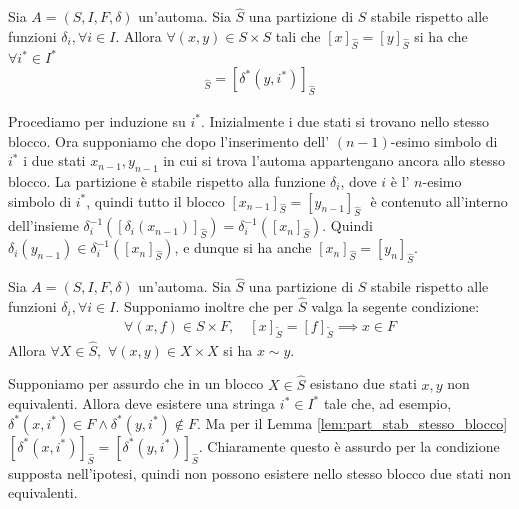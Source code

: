 \begin{lemma}
    \label{lem:part_stab_stesso_blocco}
    Sia $A = (S,I,F,\delta)$ un'automa. Sia $\widehat{S}$ una partizione di $S$ stabile rispetto alle funzioni $\delta_i, \forall i \in I$. Allora $\forall (x,y) \in S \times S$ tali che $[x]_{\widehat{S}} = [y]_{\widehat{S}}$ si ha che $\forall i^* \in I^*$
    \begin{gather*}
        [\delta^*(x,i^*)]_{\widehat{S}} = [\delta^*(y,i^*)]_{\widehat{S}}
    \end{gather*}
\end{lemma}
\begin{proof2}
    Procediamo per induzione su $i^*$. Inizialmente i due stati si trovano nello stesso blocco. Ora supponiamo che dopo l'inserimento dell' $(n-1)$-esimo simbolo di $i^*$ i due stati $x_{n-1}, y_{n-1}$ in cui si trova l'automa appartengano ancora allo stesso blocco. La partizione è stabile rispetto alla funzione $\delta_i$, dove $i$ è l' $n$-esimo simbolo di $i^*$, quindi tutto il blocco $[x_{n-1}]_{\widehat{S}} = [y_{n-1}]_{\widehat{S}}\,\,$ è contenuto all'interno dell'insieme $\delta_i^{-1}([\delta_i(x_{n-1})]_{\widehat{S}}) = \delta_i^{-1}([x_n]_{\widehat{S}})$. Quindi $\delta_i(y_{n-1}) \in \delta_i^{-1}([x_n]_{\widehat{S}})$, e dunque si ha anche $[x_n]_{\widehat{S}} = [y_n]_{\widehat{S}}$.
\end{proof2}
\begin{lemma}
    \label{lem:part_stab_equiv}
    Sia $A = (S,I,F,\delta)$ un'automa. Sia $\widehat{S}$ una partizione di $S$ stabile rispetto alle funzioni $\delta_i, \forall i \in I$. Supponiamo inoltre che per $\widehat{S}$ valga la segente condizione:
    \begin{gather*}
        \forall (x,f) \in S \times F, \quad [x]_{\widetilde{S}} = [f]_{\widetilde{S}} \implies x \in F
    \end{gather*}
    Allora $\forall X \in \widehat{S}, \,\,\forall (x,y) \in X \times X$ si ha $x \sim y$.
\end{lemma}
\begin{proof2}
    Supponiamo per assurdo che in un blocco $X \in \widehat{S}$ esistano due stati $x,y$ non equivalenti. Allora deve esistere una stringa $i^* \in I^*$ tale che, ad esempio, $\delta^*(x,i^*) \in F \land \delta^*(y,i^*) \not\in F$. Ma per il Lemma \ref{lem:part_stab_stesso_blocco} $[\delta^*(x,i^*)]_{\widehat{S}} = [\delta^*(y,i^*)]_{\widehat{S}}$. Chiaramente questo è assurdo per la condizione supposta nell'ipotesi, quindi non possono esistere nello stesso blocco due stati non equivalenti.
\end{proof2}

